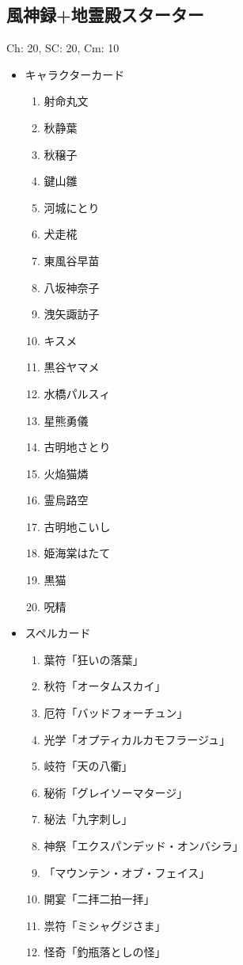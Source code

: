 \documentclass[line_length=22zw,number_of_lines=45,twocolumn]{jlreq}
\begin{document}
\subsection{風神録+地霊殿スターター}
Ch: 20, SC: 20, Cm: 10
\begin{itemize}
	\item キャラクターカード
		\begin{enumerate}
			\item 射命丸文
			\item 秋静葉
			\item 秋穣子
			\item 鍵山雛
			\item 河城にとり
			\item 犬走椛
			\item 東風谷早苗
			\item 八坂神奈子
			\item 洩矢諏訪子
			\item キスメ
			\item 黒谷ヤマメ
			\item 水橋パルスィ
			\item 星熊勇儀
			\item 古明地さとり
			\item 火焔猫燐
			\item 霊烏路空
			\item 古明地こいし
			\item 姫海棠はたて
			\item 黒猫
			\item 呪精
		\end{enumerate}
	\item スペルカード
		\begin{enumerate}
			\item 葉符「狂いの落葉」
			\item 秋符「オータムスカイ」
			\item 厄符「バッドフォーチュン」
			\item 光学「オプティカルカモフラージュ」
			\item 岐符「天の八衢」
			\item 秘術「グレイソーマタージ」
			\item 秘法「九字刺し」
			\item 神祭「エクスパンデッド・オンバシラ」
			\item 「マウンテン・オブ・フェイス」
			\item 開宴「二拝二拍一拝」
			\item 祟符「ミシャグジさま」
			\item 怪奇「釣瓶落としの怪」

\end{enumerate}
\end{itemize}
\end{document}
